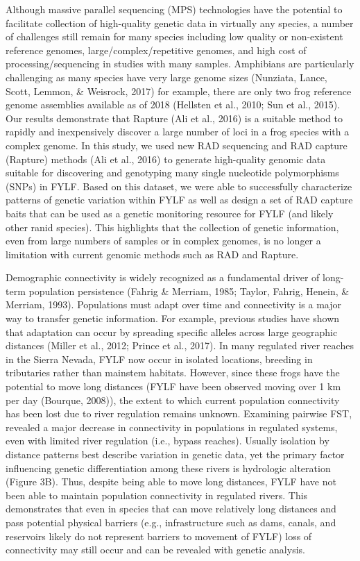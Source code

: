 \documentclass[twoside,12pt,final]{ucthesis-CA2012}
\begin{document}
\begin{ucmainmatter}
Although massive parallel sequencing (MPS) technologies have the
potential to facilitate collection of high-quality genetic data in
virtually any species, a number of challenges still remain for many
species including low quality or non-existent reference genomes,
large/complex/repetitive genomes, and high cost of processing/sequencing
in studies with many samples. Amphibians are particularly challenging as
many species have very large genome sizes (Nunziata, Lance, Scott,
Lemmon, \& Weisrock, 2017) for example, there are only two frog
reference genome assemblies available as of 2018 (Hellsten et al., 2010;
Sun et al., 2015). Our results demonstrate that Rapture (Ali et al.,
2016) is a suitable method to rapidly and inexpensively discover a large
number of loci in a frog species with a complex genome. In this study,
we used new RAD sequencing and RAD capture (Rapture) methods (Ali et
al., 2016) to generate high-quality genomic data suitable for
discovering and genotyping many single nucleotide polymorphisms (SNPs)
in FYLF. Based on this dataset, we were able to successfully
characterize patterns of genetic variation within FYLF as well as design
a set of RAD capture baits that can be used as a genetic monitoring
resource for FYLF (and likely other ranid species). This highlights that
the collection of genetic information, even from large numbers of
samples or in complex genomes, is no longer a limitation with current
genomic methods such as RAD and Rapture.

Demographic connectivity is widely recognized as a fundamental driver of
long-term population persistence (Fahrig \& Merriam, 1985; Taylor,
Fahrig, Henein, \& Merriam, 1993). Populations must adapt over time and
connectivity is a major way to transfer genetic information. For
example, previous studies have shown that adaptation can occur by
spreading specific alleles across large geographic distances (Miller et
al., 2012; Prince et al., 2017). In many regulated river reaches in the
Sierra Nevada, FYLF now occur in isolated locations, breeding in
tributaries rather than mainstem habitats. However, since these frogs
have the potential to move long distances (FYLF have been observed
moving over 1 km per day (Bourque, 2008)), the extent to which current
population connectivity has been lost due to river regulation remains
unknown. Examining pairwise FST, revealed a major decrease in
connectivity in populations in regulated systems, even with limited
river regulation (i.e., bypass reaches). Usually isolation by distance
patterns best describe variation in genetic data, yet the primary factor
influencing genetic differentiation among these rivers is hydrologic
alteration (Figure 3B). Thus, despite being able to move long distances,
FYLF have not been able to maintain population connectivity in regulated
rivers. This demonstrates that even in species that can move relatively
long distances and pass potential physical barriers (e.g.,
infrastructure such as dams, canals, and reservoirs likely do not
represent barriers to movement of FYLF) loss of connectivity may still
occur and can be revealed with genetic analysis.


\end{ucmainmatter}
\end{document}
